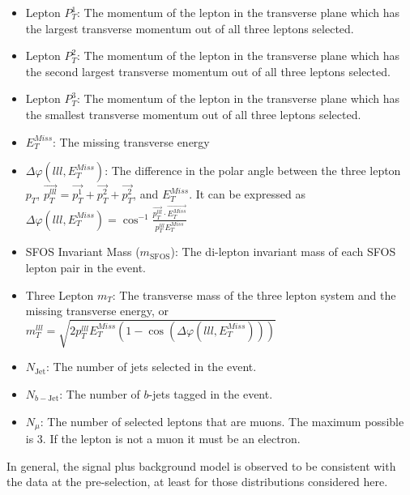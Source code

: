 \begin{itemize}
\item Lepton $P_{T}^{1}$:  The momentum of the lepton in the transverse plane
which has the largest transverse momentum out of all three leptons selected.
\item Lepton $P_{T}^{2}$:  The momentum of the lepton in the transverse plane
which has the second largest transverse momentum out of all three leptons selected.
\item Lepton $P_{T}^{3}$:  The momentum of the lepton in the transverse plane
which has the smallest transverse momentum out of all three leptons selected.
\item $E_{T}^{Miss}$:  The missing transverse energy
\item $\Delta\varphi(lll,E_{T}^{Miss})$:  The difference in the polar angle 
between the three lepton $p_{T}$, 
$\overrightarrow{p_{T}^{lll}} =  \overrightarrow{p_{T}^{1}}+ 
\overrightarrow{p_{T}^{2}}+ \overrightarrow{p_{T}^{2}}$, 
and $E_{T}^{Miss}$. It can be expressed as 
$\Delta\varphi(lll,E_{T}^{Miss}) = \cos^{-1}\frac{ \overrightarrow{p_{T}^{lll}}\cdot\overrightarrow{E_{T}^{Miss}} }{ p_{T}^{lll}E_{T}^{Miss} } $
\item SFOS Invariant Mass ($m_{\textrm{SFOS}}$): The di-lepton invariant mass
of each SFOS lepton pair in the event. %
\item Three Lepton $m_{T}$: The transverse mass of the three lepton system
and the missing transverse energy, or
$m_{T}^{lll} = \sqrt{2p_{T}^{lll}E_{T}^{Miss}(1-\cos(\Delta\varphi(lll,E_{T}^{Miss})))}$ 
\item $N_{\textrm{Jet}}$: The number of jets selected in the event.
\item $N_{b-\textrm{Jet}}$: The number of $b$-jets tagged in the event.
\item $N_{\mu}$: The number of selected leptons that are muons. The maximum
possible is 3. If the lepton is not a muon it must be an electron.
\end{itemize}
In general, the signal plus background model is observed to be consistent
with the data at the pre-selection, at least for those distributions
considered here.



